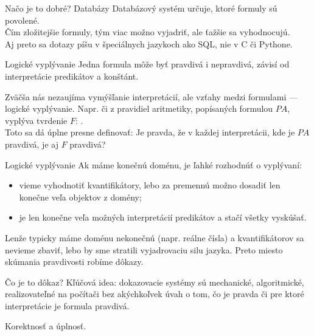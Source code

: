 \documentclass[12pt]{beamer}
\theoremstyle{definition}
\begin{document}
\begin{frame}{Načo je to dobré? Databázy}
Databázový systém určuje, ktoré formuly sú povolené.\\
Čím zložitejšie formuly, tým viac možno vyjadriť, ale ťažšie sa vyhodnocujú.\\[3mm]
Aj preto sa dotazy píšu v špeciálnych jazykoch ako SQL, nie v C či Pythone.
\end{frame}

\begin{frame}{Logické vyplývanie}
Jedna formula môže byť pravdivá i nepravdivá, závisí od interpretácie predikátov a konštánt.

Zväčša nás nezaujíma vymýšľanie interpretácií, ale vzťahy medzi formulami
--- logické vyplývanie. Napr. či z pravidiel aritmetiky, popísaných formulou $PA$, vyplýva tvrdenie $F$: .\\[2mm]

Toto sa dá úplne presne definovať:
\alert{Je pravda, že v každej interpretácii, kde je $PA$ pravdivá, je aj $F$ pravdivá?}
\end{frame}

\begin{frame}{Logické vyplývanie}
Ak máme konečnú doménu, je ľahké rozhodnúť o vyplývaní:
\begin{itemize}
\item vieme vyhodnotiť kvantifikátory, lebo za premennú možno dosadiť len konečne veľa objektov z domény;
\item je len konečne veľa možných interpretácií predikátov a stačí všetky vyskúšať.
\end{itemize}
Lenže typicky máme doménu nekonečnú (napr. reálne čísla) a kvantifikátorov sa nevieme zbaviť, lebo by sme stratili vyjadrovaciu silu jazyka. Preto miesto skúmania pravdivosti robíme dôkazy.
\end{frame}

\begin{frame}{Čo je to dôkaz?}
Kľúčová idea: dokazovacie systémy sú mechanické, algoritmické,
realizovateľné na počítači bez akýchkoľvek úvah o tom,
čo je pravda či pre ktoré interpretácie je formula pravdivá.

Korektnosť a úplnosť.
\end{frame}
\end{document}
